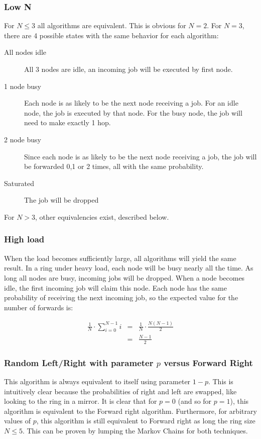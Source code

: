 \documentclass[10pt,a4paper]{article}
\begin{document}
\subsubsection*{Low N}
For $N \leq 3$ all algorithms are equivalent. This is obvious for $N=2$. For $N=3$, there are 4 possible states with the same behavior for each algorithm:
\begin{description}
\item[All nodes idle] All 3 nodes are idle, an incoming job will be executed by first node.
\item[1 node busy] Each node is as likely to be the next node receiving a job. For an idle node, the job is executed by that node. For the busy node, the job will need to make exactly 1 hop.
\item[2 node busy] Since each node is as likely to be the next node receiving a job, the job will be forwarded 0,1 or 2 times, all with the same probability.
\item[Saturated] The job will be dropped
\end{description}

For $N>3$, other equivalencies exist, described below.

\subsubsection*{High load}
When the load becomes sufficiently large, all algorithms will yield the same result. In a ring under heavy load, each node will be busy nearly all the time. As long all nodes are busy, incoming jobs will be dropped.
When a node becomes idle, the first incoming job will claim this node. Each node has the same probability of receiving the next incoming job, so the expected value for the number of forwards is:

\begin{eqnarray}
\frac{1}{N} \cdot \sum_{i=0}^{N-1} i &=& \frac{1}{N} \cdot \frac{N(N-1)}{2} \nonumber \\
&=& \frac{N-1}{2} \nonumber
\end{eqnarray}

\subsubsection*{Random Left/Right with parameter $p$ versus Forward Right}
This algorithm is always equivalent to itself using parameter $1-p$. This is intuitively clear because the probabilities of right and left are swapped, like looking to the ring in a mirror.
It is clear that for $p=0$ (and so for $p=1$), this algorithm is equivalent to the Forward right algorithm. Furthermore, for arbitrary values of $p$, this algorithm is still equivalent to Forward right as long the ring size $N \leq 5$. This can be proven by lumping the Markov Chains for both techniques.
\end{document}

